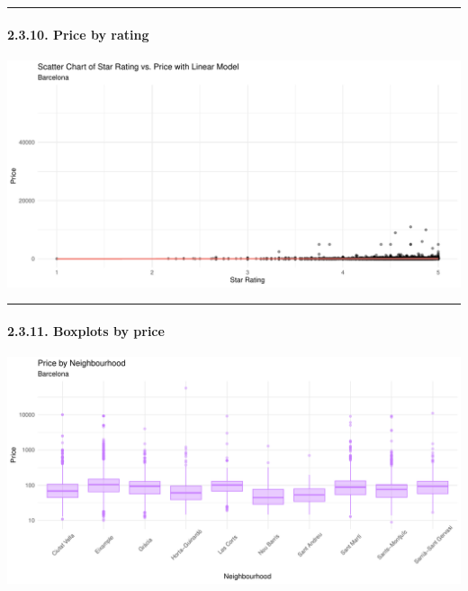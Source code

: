 \documentclass[
]{article}
\begin{document}
\begin{center}\rule{0.5\linewidth}{0.5pt}\end{center}

\hypertarget{price-by-rating}{%
\paragraph{2.3.10. Price by rating}\label{price-by-rating}}

\begin{center}\includegraphics{Barcelona-AirBnB-Insights_files/figure-latex/plot10-1} \end{center}

\begin{center}\rule{0.5\linewidth}{0.5pt}\end{center}

\hypertarget{boxplots-by-price}{%
\paragraph{2.3.11. Boxplots by price}\label{boxplots-by-price}}

\begin{center}\includegraphics{Barcelona-AirBnB-Insights_files/figure-latex/plot11-1} \end{center}
\end{document}
